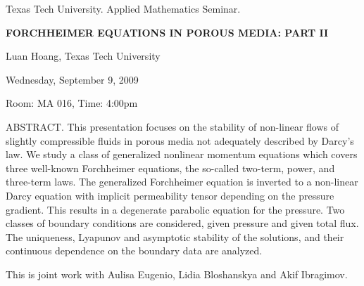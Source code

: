 \documentclass[oneside]{amsart}
\begin{document}
\begin{center}
Texas Tech University.  Applied Mathematics Seminar.

\end{center}

\begin{center}

{\LARGE \uppercase{\textbf{Forchheimer equations in porous media: Part II
}}}

Luan Hoang, Texas Tech University

Wednesday, September 9, 2009

Room: MA 016, Time: 4:00pm

\end{center}

ABSTRACT.
This presentation focuses on the stability of non-linear flows of
slightly compressible fluids in porous media not adequately described by
Darcy's law. We study a class of generalized nonlinear momentum
equations which covers three well-known Forchheimer equations, the
so-called two-term, power, and three-term laws. The generalized
Forchheimer equation is inverted to a non-linear Darcy equation with
implicit permeability tensor depending on the pressure gradient. This
results in a degenerate parabolic equation for the pressure. Two classes
of boundary conditions are considered, given pressure and given total
flux. The uniqueness, Lyapunov and asymptotic stability  of the
solutions, and their continuous dependence on the boundary data are
analyzed. 

This is joint work with Aulisa Eugenio, Lidia Bloshanskya and Akif
Ibragimov.
\end{document}
